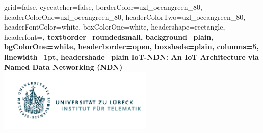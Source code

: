 \documentclass[a0paper,portrait]{baposter}
\begin{document}



\background{
}

\begin{poster}{
	grid=false,
	eyecatcher=false, 
	borderColor=uzl_oceangreen_80,
	headerColorOne=uzl_oceangreen_80,
	headerColorTwo=uzl_oceangreen_80,
	headerFontColor=white,
	boxColorOne=white,
	headershape=rectangle,
	headerfont=\large\bf,
	textborder=roundedsmall,
	background=plain,
	bgColorOne=white,
	headerborder=open,
	boxshade=plain,
	columns=5,
	linewidth=1pt,
	headershade=plain
}
{
}
{
	\vspace{0.3cm}
  \textcolor{uzl_oceangreen_80}{\textbf{IoT-NDN: An IoT Architecture via \\
Named Data Networking (NDN)}}
    \vspace{0.3cm}
}
{
  \textcolor{uzl_orange_2}{\textsf{}}
}
{
  \hspace{1cm}
  \includegraphics[height=8em]{Logo_Inst_Telematik_orig}
}


\end{poster}
\end{document}
